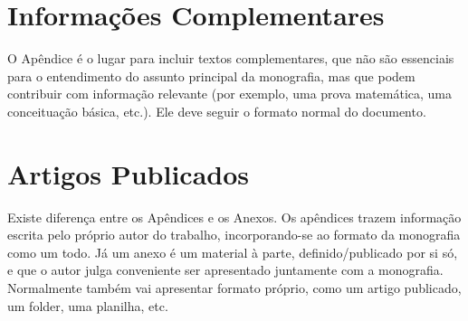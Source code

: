 \documentclass[twoside,english,brazilian]{UNISINOSmonografia}
\begin{document}
\appendix
\chapter{Informações Complementares}

O Apêndice é o lugar para incluir textos complementares, que não são essenciais para o entendimento do assunto principal da monografia, mas que podem contribuir com informação relevante (por exemplo, uma prova matemática, uma conceituação básica, etc.).  Ele deve seguir o formato normal do documento.

\annex
\chapter{Artigos Publicados}
Existe diferença entre os Apêndices e os Anexos.  Os apêndices trazem informação escrita pelo próprio autor do trabalho, incorporando-se ao formato da monografia como um todo.  Já um anexo é um material à parte, definido/publicado por si só, e que o autor julga conveniente ser apresentado juntamente com a monografia.  Normalmente também vai apresentar formato próprio, como um artigo publicado, um folder, uma planilha, etc.
\end{document}
